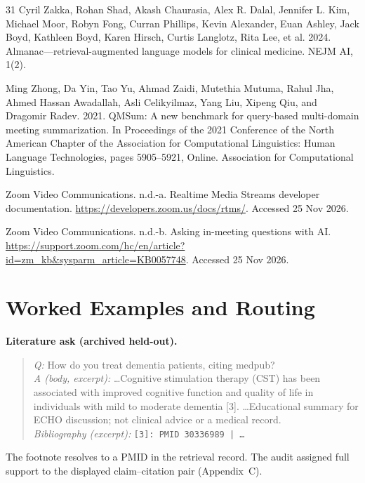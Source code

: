 \documentclass[11pt]{article}
\begin{document}
\begin{thebibliography}{31}
Cyril Zakka, Rohan Shad, Akash Chaurasia, Alex R. Dalal, Jennifer L. Kim, Michael Moor, Robyn Fong, Curran Phillips, Kevin Alexander, Euan Ashley, Jack Boyd, Kathleen Boyd, Karen Hirsch, Curtis Langlotz, Rita Lee, et al. 2024. Almanac---retrieval-augmented language models for clinical medicine. NEJM AI, 1(2).

Ming Zhong, Da Yin, Tao Yu, Ahmad Zaidi, Mutethia Mutuma, Rahul Jha, Ahmed Hassan Awadallah, Asli Celikyilmaz, Yang Liu, Xipeng Qiu, and Dragomir Radev. 2021. QMSum: A new benchmark for query-based multi-domain meeting summarization. In Proceedings of the 2021 Conference of the North American Chapter of the Association for Computational Linguistics: Human Language Technologies, pages 5905--5921, Online. Association for Computational Linguistics.

Zoom Video Communications. n.d.-a. Realtime Media Streams developer documentation. \url{https://developers.zoom.us/docs/rtms/}. Accessed 25 Nov 2026.

Zoom Video Communications. n.d.-b. Asking in-meeting questions with AI. \url{https://support.zoom.com/hc/en/article?id=zm_kb&sysparm_article=KB0057748}. Accessed 25 Nov 2026.

\end{thebibliography}

\clearpage

\appendix

\balance

\section{Worked Examples and Routing}

\textbf{Literature ask (archived held-out).}
\begin{quote}\small
\emph{Q:} How do you treat dementia patients, citing medpub?\\
\emph{A (body, excerpt):} \ldots Cognitive stimulation therapy (CST) has been associated with improved cognitive function and quality of life in individuals with mild to moderate dementia [3]. \ldots Educational summary for ECHO discussion; not clinical advice or a medical record.\\
\emph{Bibliography (excerpt):} \texttt{[3]: PMID 30336989 | \ldots}
\end{quote}
The footnote resolves to a PMID in the retrieval record. The audit assigned full support to the displayed claim--citation pair (Appendix~C).
\end{document}
